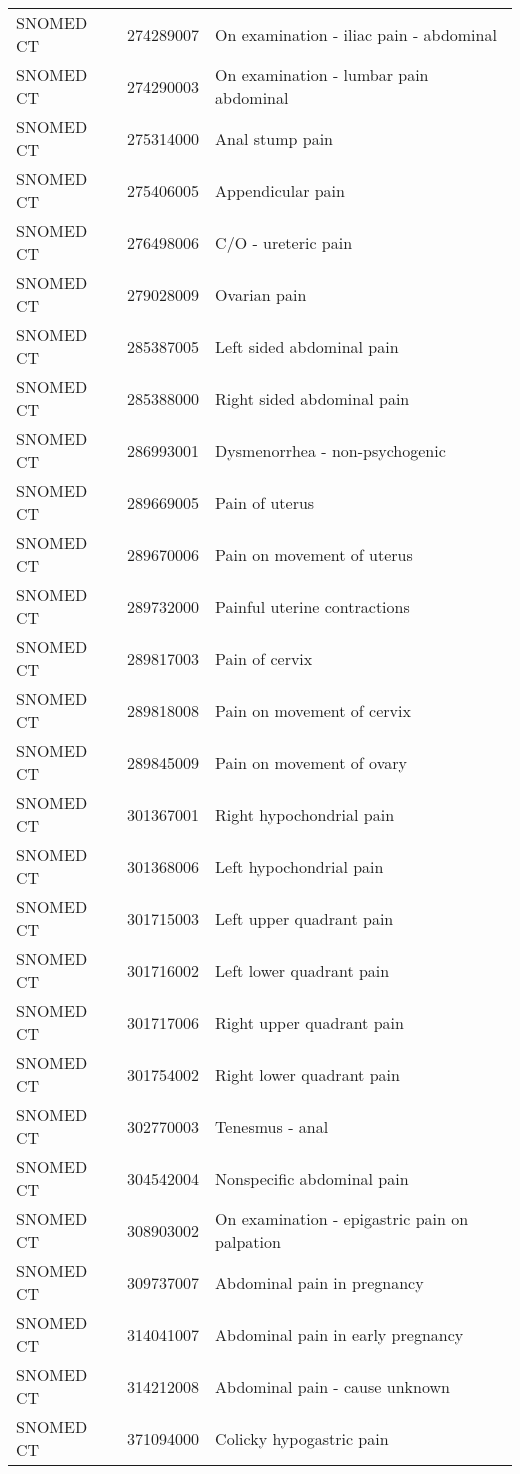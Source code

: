 \begin{longtable}{p{}p{}p{}}
  SNOMED CT & 274289007 & On examination - iliac pain - abdominal \\ 
  SNOMED CT & 274290003 & On examination - lumbar pain abdominal \\ 
  SNOMED CT & 275314000 & Anal stump pain \\ 
  SNOMED CT & 275406005 & Appendicular pain \\ 
  SNOMED CT & 276498006 & C/O - ureteric pain \\ 
  SNOMED CT & 279028009 & Ovarian pain \\ 
  SNOMED CT & 285387005 & Left sided abdominal pain \\ 
  SNOMED CT & 285388000 & Right sided abdominal pain \\ 
  SNOMED CT & 286993001 & Dysmenorrhea - non-psychogenic \\ 
  SNOMED CT & 289669005 & Pain of uterus \\ 
  SNOMED CT & 289670006 & Pain on movement of uterus \\ 
  SNOMED CT & 289732000 & Painful uterine contractions \\ 
  SNOMED CT & 289817003 & Pain of cervix \\ 
  SNOMED CT & 289818008 & Pain on movement of cervix \\ 
  SNOMED CT & 289845009 & Pain on movement of ovary \\ 
  SNOMED CT & 301367001 & Right hypochondrial pain \\ 
  SNOMED CT & 301368006 & Left hypochondrial pain \\ 
  SNOMED CT & 301715003 & Left upper quadrant pain \\ 
  SNOMED CT & 301716002 & Left lower quadrant pain \\ 
  SNOMED CT & 301717006 & Right upper quadrant pain \\ 
  SNOMED CT & 301754002 & Right lower quadrant pain \\ 
  SNOMED CT & 302770003 & Tenesmus - anal \\ 
  SNOMED CT & 304542004 & Nonspecific abdominal pain \\ 
  SNOMED CT & 308903002 & On examination - epigastric pain on palpation \\ 
  SNOMED CT & 309737007 & Abdominal pain in pregnancy \\ 
  SNOMED CT & 314041007 & Abdominal pain in early pregnancy \\ 
  SNOMED CT & 314212008 & Abdominal pain - cause unknown \\ 
  SNOMED CT & 371094000 & Colicky hypogastric pain \\ 

\end{longtable}
